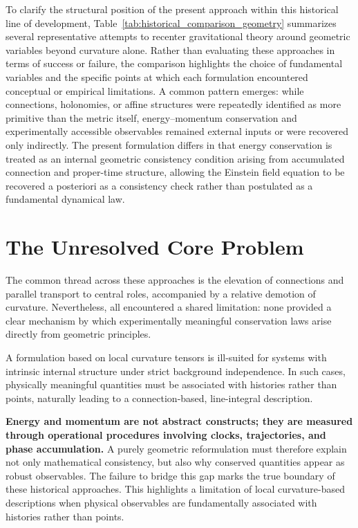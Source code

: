 \documentclass[%
 reprint,
 amsmath,amssymb,
 aps,
 prb,
]{revtex4-2}
\numberwithin{equation}{section}
\begin{document}
To clarify the structural position of the present approach within this historical line of development, Table~\ref{tab:historical_comparison_geometry} summarizes several representative attempts to recenter gravitational theory around geometric variables beyond curvature alone. 
Rather than evaluating these approaches in terms of success or failure, the comparison highlights the choice of fundamental variables and the specific points at which each formulation encountered conceptual or empirical limitations. 
A common pattern emerges: while connections, holonomies, or affine structures were repeatedly identified as more primitive than the metric itself, energy--momentum conservation and experimentally accessible observables remained external inputs or were recovered only indirectly. 
The present formulation differs in that energy conservation is treated as an internal geometric consistency condition arising from accumulated connection and proper-time structure, allowing the Einstein field equation to be recovered a posteriori as a consistency check rather than postulated as a fundamental dynamical law.


\section{The Unresolved Core Problem}
\label{sec:core_problem}

The common thread across these approaches is the elevation of connections and parallel transport to central roles, accompanied by a relative demotion of curvature. Nevertheless, all encountered a shared limitation: none provided a clear mechanism by which experimentally meaningful conservation laws arise directly from geometric principles.

A formulation based on local curvature tensors is ill-suited for systems with intrinsic internal structure under strict background independence. In such cases, physically meaningful quantities must be associated with histories rather than points, naturally leading to a connection-based, line-integral description.

\textbf{Energy and momentum are not abstract constructs; they are measured through operational procedures involving clocks, trajectories, and phase accumulation.} A purely geometric reformulation must therefore explain not only mathematical consistency, but also why conserved quantities appear as robust observables. The failure to bridge this gap marks the true boundary of these historical approaches. This highlights a limitation of local curvature-based descriptions when physical observables are fundamentally associated with histories rather than points.
\end{document}
